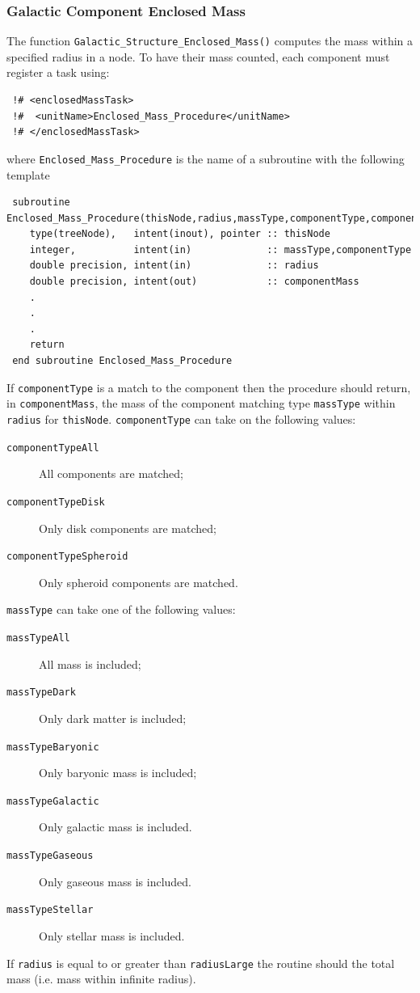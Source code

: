 \subsubsection{Galactic Component Enclosed Mass}

The function {\tt Galactic\_Structure\_Enclosed\_Mass()} computes the mass within a specified radius in a node. To have their mass counted, each component must register a task using:
\begin{verbatim}
 !# <enclosedMassTask>
 !#  <unitName>Enclosed_Mass_Procedure</unitName>
 !# </enclosedMassTask>
\end{verbatim}
where {\tt Enclosed\_Mass\_Procedure} is the name of a subroutine with the following template
\begin{verbatim}
 subroutine Enclosed_Mass_Procedure(thisNode,radius,massType,componentType,componentMass)
    type(treeNode),   intent(inout), pointer :: thisNode
    integer,          intent(in)             :: massType,componentType
    double precision, intent(in)             :: radius
    double precision, intent(out)            :: componentMass
    .
    .
    .
    return
 end subroutine Enclosed_Mass_Procedure
\end{verbatim}
If {\tt componentType} is a match to the component then the procedure should return, in {\tt componentMass}, the mass of the component matching type {\tt massType} within {\tt radius} for {\tt thisNode}. {\tt componentType} can take on the following values:
\begin{description}
 \item [{\tt componentTypeAll}] All components are matched;
 \item [{\tt componentTypeDisk}] Only disk components are matched;
 \item [{\tt componentTypeSpheroid}] Only spheroid components are matched.
\end{description}
{\tt massType} can take one of the following values:
\begin{description}
 \item [{\tt massTypeAll}] All mass is included;
 \item [{\tt massTypeDark}] Only dark matter is included;
 \item [{\tt massTypeBaryonic}] Only baryonic mass is included;
 \item [{\tt massTypeGalactic}] Only galactic mass is included.
 \item [{\tt massTypeGaseous}] Only gaseous mass is included.
 \item [{\tt massTypeStellar}] Only stellar mass is included.
\end{description}
If {\tt radius} is equal to or greater than {\tt radiusLarge} the routine should the total mass (i.e. mass within infinite radius).

